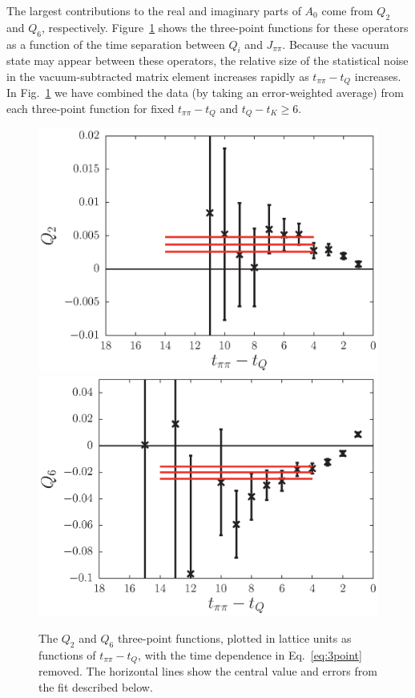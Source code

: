 \documentclass[aps,prl,
superscriptaddress,
showpacs,
preprintnumbers,
bibnotes,
amsmath,
amssymb,
twocolumn,
floatfix,
]{revtex4-1}
\begin{document}
The largest contributions to the real and imaginary parts of $A_0$ come from $Q_2$ and $Q_6$, respectively.   Figure~\ref{fig:Q_eff} shows the three-point functions for these operators as a function of the time separation between $Q_i$ and $J_{\pi\pi}$.   Because the vacuum state may appear between these operators, the relative size of the statistical noise in the vacuum-subtracted matrix element increases rapidly as $t_{\pi\pi}-t_Q$ increases.  In Fig.~\ref{fig:Q_eff} we have combined the data (by taking an error-weighted average) from each three-point function for fixed $t_{\pi\pi}-t_Q$ and $t_Q -t_K \ge 6$.  

\begin{figure}[htb]
\begin{center}
\includegraphics[width=0.8\linewidth]{figs/Q_2.eps}
\includegraphics[width=0.8\linewidth]{figs/Q_6.eps}
\end{center} 
\caption{The $Q_2$ and $Q_6$ three-point functions, plotted in lattice units as functions of $t_{\pi\pi} - t_Q$, with the time dependence in Eq.~\eqref{eq:3point} removed.  The horizontal lines show the central value and errors from the fit described below.}
\label{fig:Q_eff}
\end{figure}
\end{document}
